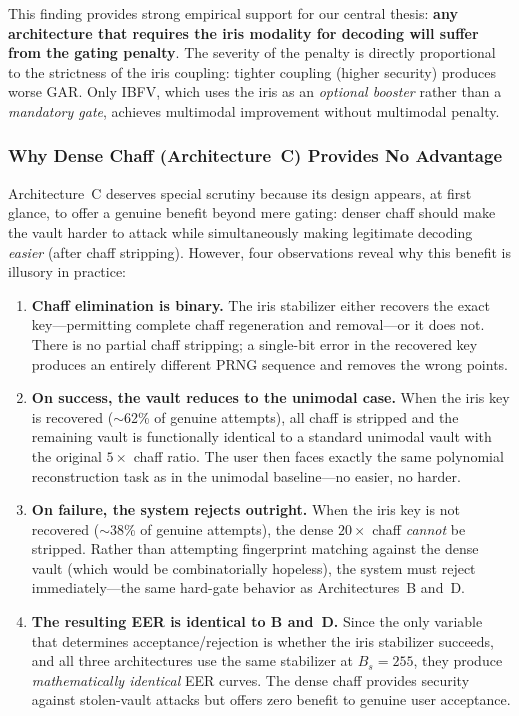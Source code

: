 \documentclass[conference]{IEEEtran}
\newcommand{\IBFV}{\textsf{IBFV}}
\begin{document}
This finding provides strong empirical support for our central thesis: \textbf{any architecture that requires the iris modality for decoding will suffer from the gating penalty}. The severity of the penalty is directly proportional to the strictness of the iris coupling: tighter coupling (higher security) produces worse GAR. Only \IBFV{}, which uses the iris as an \emph{optional booster} rather than a \emph{mandatory gate}, achieves multimodal improvement without multimodal penalty.

\subsubsection{Why Dense Chaff (Architecture~C) Provides No Advantage}
\label{sec:chaff_analysis}

Architecture~C deserves special scrutiny because its design appears, at first glance, to offer a genuine benefit beyond mere gating: denser chaff should make the vault harder to attack while simultaneously making legitimate decoding \emph{easier} (after chaff stripping). However, four observations reveal why this benefit is illusory in practice:

\begin{enumerate}
    \item \textbf{Chaff elimination is binary.} The iris stabilizer either recovers the exact key---permitting complete chaff regeneration and removal---or it does not. There is no partial chaff stripping; a single-bit error in the recovered key produces an entirely different PRNG sequence and removes the wrong points.
    \item \textbf{On success, the vault reduces to the unimodal case.} When the iris key is recovered ($\sim$62\% of genuine attempts), all chaff is stripped and the remaining vault is functionally identical to a standard unimodal vault with the original $5\times$ chaff ratio. The user then faces exactly the same polynomial reconstruction task as in the unimodal baseline---no easier, no harder.
    \item \textbf{On failure, the system rejects outright.} When the iris key is not recovered ($\sim$38\% of genuine attempts), the dense $20\times$ chaff \emph{cannot} be stripped. Rather than attempting fingerprint matching against the dense vault (which would be combinatorially hopeless), the system must reject immediately---the same hard-gate behavior as Architectures~B and~D.
    \item \textbf{The resulting EER is identical to B and~D.} Since the only variable that determines acceptance/rejection is whether the iris stabilizer succeeds, and all three architectures use the same stabilizer at $B_s = 255$, they produce \emph{mathematically identical} EER curves. The dense chaff provides security against stolen-vault attacks but offers zero benefit to genuine user acceptance.
\end{enumerate}
\end{document}
